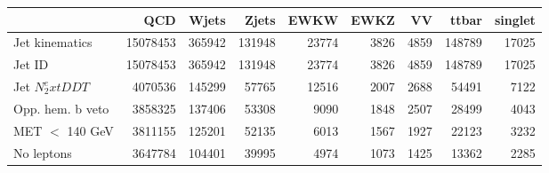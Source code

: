 \begin{tabular}{lrrrrrrrr}
\toprule
 & QCD & Wjets & Zjets & EWKW & EWKZ & VV & ttbar & singlet \\
\midrule
Jet kinematics & 15078453 & 365942 & 131948 & 23774 & 3826 & 4859 & 148789 & 17025 \\
Jet ID & 15078453 & 365942 & 131948 & 23774 & 3826 & 4859 & 148789 & 17025 \\
Jet $N_2^	ext{DDT}$ & 4070536 & 145299 & 57765 & 12516 & 2007 & 2688 & 54491 & 7122 \\
Opp. hem. b veto & 3858325 & 137406 & 53308 & 9090 & 1848 & 2507 & 28499 & 4043 \\
MET $<$ 140 GeV & 3811155 & 125201 & 52135 & 6013 & 1567 & 1927 & 22123 & 3232 \\
No leptons & 3647784 & 104401 & 39995 & 4974 & 1073 & 1425 & 13362 & 2285 \\
\bottomrule
\end{tabular}
